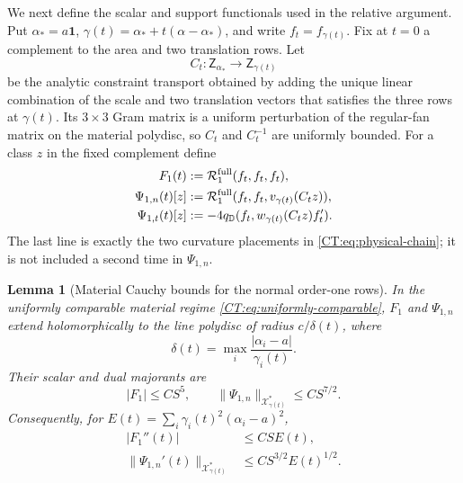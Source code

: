 \documentclass[11pt]{amsart}
\numberwithin{equation}{section}
\newtheorem{lemma}[theorem]{Lemma}
\theoremstyle{definition}
\theoremstyle{remark}
\newcommand{\qD}{q_{\mathbb D}}
\newcommand{\Rfull}{\mathcal R_1^{\rm full}}
\newcommand{\X}{\mathcal X}
\begin{document}
We next define the scalar and support functionals used in the relative
argument.  Put $\alpha_*=a\mathbf1$,
$\gamma(t)=\alpha_*+t(\alpha-\alpha_*)$, and write
$f_t=f_{\gamma(t)}$.  Fix at $t=0$ a complement to the area and two
translation rows.  Let
\begin{equation}\label{CT:eq:constraint-transport}
 C_t:\mathsf Z_{\alpha_*}\longrightarrow\mathsf Z_{\gamma(t)}
\end{equation}
be the analytic constraint transport obtained by adding the unique linear
combination of the scale and two translation vectors that satisfies the
three rows at $\gamma(t)$.  Its $3\times3$ Gram matrix is a uniform
perturbation of the regular-fan matrix on the material polydisc, so $C_t$
and $C_t^{-1}$ are uniformly bounded.  For a class $z$ in the fixed
complement define
\begin{align}
 F_1(t)&:=\Rfull(f_t,f_t,f_t),\label{CT:eq:F1-definition}\\
 \Psi_{1,n}(t)[z]
 &:=\Rfull(f_t,f_t,v_{\gamma(t)}(C_tz)),
 \label{CT:eq:Psi1n-definition}\\
\Psi_{1,t}(t)[z]
 &:=-4\qD
 (f_t,w_{\gamma(t)}(C_tz)f_t').
 \label{CT:eq:Psi1t-definition}
\end{align}
The last line is exactly the two curvature placements in
\eqref{CT:eq:physical-chain}; it is not included a second time in
$\Psi_{1,n}$.

\begin{lemma}[Material Cauchy bounds for the normal order-one rows]
\label{CT:lem:R-Cauchy}
In the uniformly comparable material regime
\eqref{CT:eq:uniformly-comparable}, $F_1$ and $\Psi_{1,n}$ extend
holomorphically to the line polydisc of radius $c/\delta(t)$, where
\begin{equation*}
 \delta(t)=\max_i\frac{|\alpha_i-a|}{\gamma_i(t)}.
\end{equation*}
Their scalar and dual majorants are
\begin{equation}\label{CT:eq:R-complex-majorants}
 |F_1|\le CS^5,\qquad
 \|\Psi_{1,n}\|_{\X_{\gamma(t)}^*}\le CS^{7/2}.
\end{equation}
Consequently, for
$E(t)=\sum_i\gamma_i(t)^2(\alpha_i-a)^2$,
\begin{align}
 |F_1''(t)|&\le CSE(t),\label{CT:eq:F1-Cauchy}\\
 \|\Psi_{1,n}'(t)\|_{\X_{\gamma(t)}^*}
 &\le CS^{3/2}E(t)^{1/2}.\label{CT:eq:Psi1n-Cauchy}
\end{align}
\end{lemma}
\end{document}
